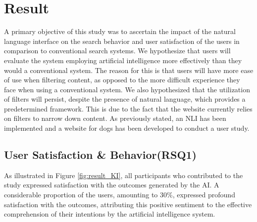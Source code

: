 \documentclass[../../submission.tex]{subfiles}
\begin{document}
\section{Result}
A primary objective of this study was to ascertain the impact of the
natural language interface on the search behavior and user satisfaction of the users in comparison to conventional search systems.
We hypothesize that users will evaluate the system employing artificial intelligence more effectively than they would a conventional system.
The reason for this is that users will have more ease of use when filtering content, as opposed to the more difficult experience they face when using a conventional system.
We also hypothesized that the utilization of filters will persist, despite the presence of natural language, which provides a predetermined framework. 
This is due to the fact that the website currently relies on filters to narrow down content.
As previously stated, an NLI has been implemented and a website for dogs has been developed to conduct a user study.


\subsection{User Satisfaction \& Behavior(RSQ1)}
As illustrated in Figure \ref{fig:result_KI}, all participants who contributed to the study 
expressed satisfaction with the outcomes generated by the AI.  A considerable 
proportion of the users, amounting to 30\%, expressed profound satisfaction with 
the outcomes, attributing this positive sentiment to the effective comprehension 
of their intentions by the artificial intelligence system.
\end{document}
